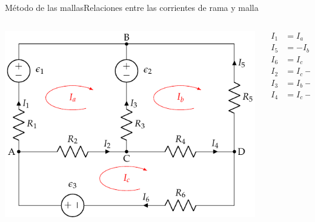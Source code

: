 \documentclass[aspectratio=169, xcolor={usenames,svgnames,dvipsnames}]{beamer}
\begin{document}
\begin{frame}{Método de las mallas}{Relaciones entre las corrientes de rama y malla}
\begin{columns}
\begin{column}{0.6\columnwidth}
\begin{center}
\includegraphics[width=.9\linewidth]{../figs/mallas1_corrientes.pdf}
\end{center}
\end{column}
\begin{column}{0.4\columnwidth}

\begin{align*}
  I_1 &= I_a\\
  I_5 &= -I_b\\
  I_6 &= I_c\\
  I_2 &= I_c -I_a\\
  I_3 &= I_b - I_a\\
  I_4 &= I_c - I_b
\end{align*}
\end{column}
\end{columns}
\end{frame}
\end{document}
